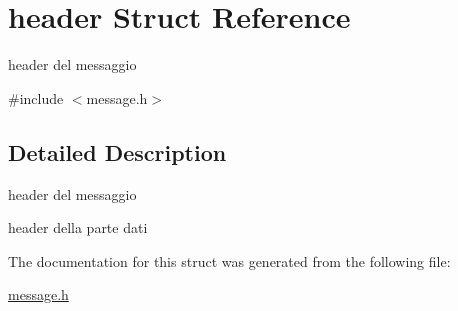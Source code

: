 \hypertarget{structheader}{}\section{header Struct Reference}
\label{structheader}


header del messaggio  




{\ttfamily \#include $<$message.\+h$>$}



\subsection{Detailed Description}
header del messaggio 

header della parte dati 

The documentation for this struct was generated from the following file\+:\begin{DoxyCompactItemize}
\item 
\hyperlink{message_8h}{message.\+h}\end{DoxyCompactItemize}
